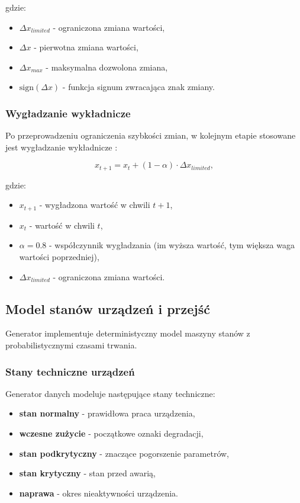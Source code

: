 gdzie:
\begin{itemize}
    \item $\Delta x_{limited}$ - ograniczona zmiana wartości,
    \item $\Delta x$ - pierwotna zmiana wartości,
    \item $\Delta x_{max}$ - maksymalna dozwolona zmiana,
    \item $\text{sign}(\Delta x)$ - funkcja signum zwracająca znak zmiany.
\end{itemize}

\subsubsection{Wygładzanie wykładnicze}

Po przeprowadzeniu ograniczenia szybkości zmian, w kolejnym etapie stosowane jest wygładzanie wykładnicze \cite{hyndman_forecasting}:

\begin{equation}
x_{t+1} = x_t + (1-\alpha) \cdot \Delta x_{limited},
\end{equation}

gdzie:
\begin{itemize}
    \item $x_{t+1}$ - wygładzona wartość w chwili $t+1$,
    \item $x_t$ - wartość w chwili $t$,
    \item $\alpha = 0.8$ - współczynnik wygładzania (im wyższa wartość, tym większa waga wartości poprzedniej),
    \item $\Delta x_{limited}$ - ograniczona zmiana wartości.
\end{itemize}

\subsection{Model stanów urządzeń i przejść}
\label{subsec:model_stanow}

Generator implementuje deterministyczny model maszyny stanów z probabilistycznymi czasami trwania.

\subsubsection{Stany techniczne urządzeń}

Generator danych modeluje następujące stany techniczne:

\begin{itemize}
    \item \textbf{stan normalny} - prawidłowa praca urządzenia,
    \item \textbf{wczesne zużycie} - początkowe oznaki degradacji,
    \item \textbf{stan podkrytyczny} - znaczące pogorszenie parametrów,
    \item \textbf{stan krytyczny} - stan przed awarią,
    \item \textbf{naprawa} - okres nieaktywności urządzenia.
\end{itemize}

